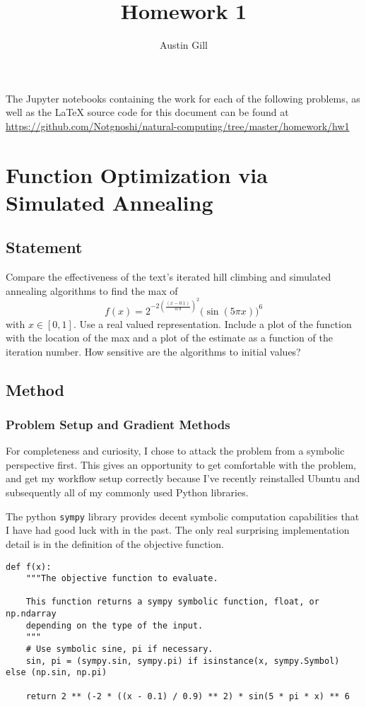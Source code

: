 \documentclass{article}
\title{Homework 1}
\author{Austin Gill}
\begin{document}
\maketitle
\begingroup
\hypersetup{linkcolor=black}
\tableofcontents
\endgroup
\newpage

The Jupyter notebooks containing the work for each of the following problems, as well as the
\LaTeX{} source code for this document can be found at
\url{https://github.com/Notgnoshi/natural-computing/tree/master/homework/hw1}

\section{Function Optimization via Simulated Annealing}\label{prob:1}

\subsection{Statement}
Compare the effectiveness of the text's iterated hill climbing and simulated annealing algorithms
to find the max of
\[ f(x) = 2^{-2{\left(\frac{(x - 0.1)}{0.9}\right)}^2}{\big(\sin(5\pi x)\big)}^6\]
with $x\in [0,1]$. Use a real valued representation. Include a plot of the function with the
location of the max and a plot of the estimate as a function of the iteration number. How sensitive
are the algorithms to initial values?

\subsection{Method}

\subsubsection{Problem Setup and Gradient Methods}

For completeness and curiosity, I chose to attack the problem from a symbolic perspective first.
This gives an opportunity to get comfortable with the problem, and get my workflow setup correctly
because I've recently reinstalled Ubuntu and subsequently all of my commonly used Python libraries.

The python \texttt{sympy} library provides decent symbolic computation capabilities
that I have had good luck with in the past. The only real surprising implementation detail is in
the definition of the objective function.

\begin{verbatim}
def f(x):
    """The objective function to evaluate.

    This function returns a sympy symbolic function, float, or np.ndarray
    depending on the type of the input.
    """
    # Use symbolic sine, pi if necessary.
    sin, pi = (sympy.sin, sympy.pi) if isinstance(x, sympy.Symbol) else (np.sin, np.pi)

    return 2 ** (-2 * ((x - 0.1) / 0.9) ** 2) * sin(5 * pi * x) ** 6
\end{verbatim}
\end{document}
